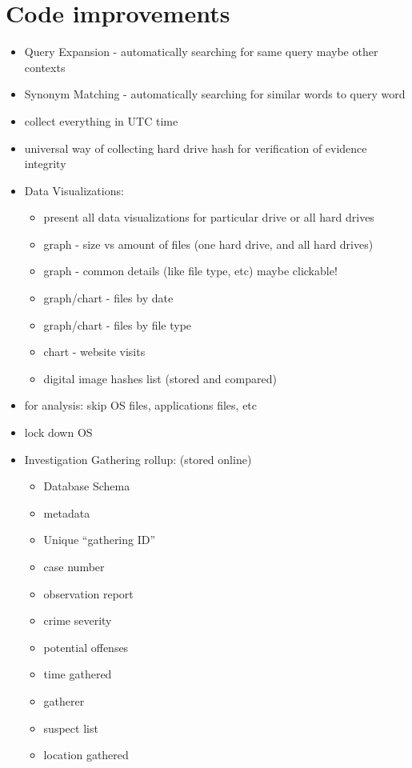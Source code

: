 \documentclass[12pt]{article}
\begin{document}
\section{Code improvements}
\begin{itemize}
  \item Query Expansion - automatically searching for same query maybe other contexts
  \item Synonym Matching - automatically searching for similar words to query word
  \item collect everything in UTC time
  \item universal way of collecting hard drive hash for verification of evidence integrity
  \item Data Visualizations:
  \begin{itemize}
    \item present all data visualizations for particular drive or all hard drives
    \item graph - size vs amount of files (one hard drive, and all hard drives)
    \item graph - common details (like file type, etc) maybe clickable!
    \item graph/chart - files by date
    \item graph/chart - files by file type
    \item chart - website visits
    \item digital image hashes list (stored and compared)
  \end{itemize}
  \item for analysis: skip OS files, applications files, etc
  \item lock down OS
  \item Investigation Gathering rollup: (stored online)
  \begin{itemize}
    \item Database Schema
    \item metadata
    \item Unique ``gathering ID''
    \item case number
    \item observation report
    \item crime severity
    \item potential offenses
    \item time gathered
    \item gatherer
    \item suspect list
    \item location gathered

\end{itemize}
\end{itemize}
\end{document}
